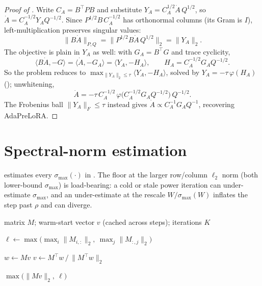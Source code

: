 \documentclass[11pt]{article}
\newcommand{\smax}{\sigma_{\max}}
\newcommand{\polar}{\varphi}                 %
\theoremstyle{plain}
\theoremstyle{definition}
\theoremstyle{remark}
\begin{document}
\begin{proof}[Proof of ]
Write $C_A=B^\top P B$ and substitute $Y_A=C_A^{1/2}\dot A\,Q^{1/2}$, so $\dot A=C_A^{-1/2}Y_A Q^{-1/2}$. Since $P^{1/2}B\,C_A^{-1/2}$ has orthonormal columns (its Gram is $I$), left-multiplication preserves singular values:
\[
  \|B\dot A\|_{P,Q}=\|P^{1/2}B\dot A\,Q^{1/2}\|_2=\|Y_A\|_2 .
\]
The objective is plain in $Y_A$ as well: with $G_A=B^\top G$ and trace cyclicity,
\[
  \langle B\dot A,-G\rangle=\langle\dot A,-G_A\rangle=\langle Y_A,-H_A\rangle,\qquad H_A=C_A^{-1/2}G_A Q^{-1/2}.
\]
So the problem reduces to $\max_{\|Y_A\|_2\le\tau}\langle Y_A,-H_A\rangle$, solved by $Y_A=-\tau\,\polar(H_A)$ (); unwhitening,
\[
  \dot A=-\tau\,C_A^{-1/2}\,\polar\!\big(C_A^{-1/2}G_A Q^{-1/2}\big)\,Q^{-1/2}.
\]
The Frobenius ball $\|Y_A\|_F\le\tau$ instead gives $\dot A\propto C_A^{-1}G_A Q^{-1}$, recovering AdaPreLoRA.
\end{proof}

\section{Spectral-norm estimation}
\label{app:smax}
 estimates every $\smax(\cdot)$ in . The floor at the larger row/column $\ell_2$ norm (both lower-bound $\smax$) is load-bearing: a cold or stale power iteration can under-estimate $\smax$, and an under-estimate at the rescale $W/\smax(W)$ inflates the step past $\rho$ and can diverge.

\begin{algorithm}[h]
\caption{Guarded spectral-norm estimate $\smax(M)$}
\label{alg:smax}
\begin{algorithmic}[1]
\Require matrix $M$; warm-start vector $v$ (cached across steps); iterations $K$
\Statex

\State $\ell\gets\max\!\big(\max_i\|M_{i,:}\|_2,\ \max_j\|M_{:,j}\|_2\big)$
\Statex

 
  \State $w\gets Mv$
  \State $v\gets M^\top w \,/\, \|M^\top w\|_2$
\EndFor
\Statex

\State \Return $\max\!\big(\|Mv\|_2,\ \ell\big)$ 
\end{algorithmic}
\end{algorithm}
\end{document}
